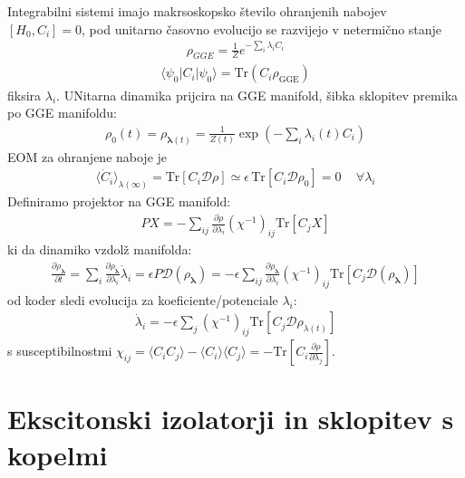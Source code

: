 \documentclass[a4paper,10pt]{article}
\begin{document}
Integrabilni sistemi imajo makrsoskopsko število ohranjenih nabojev $[H_0, C_i]=0$, pod unitarno časovno evolucijo se razvijejo v netermično stanje
\begin{align}
  \rho_{GGE} = \frac{1}{Z} e^{-\sum_{i} \lambda_{i} C_{i}}
\end{align}
\begin{align}
  \langle \psi_0 \vert{} C_i \vert{} \psi_0 \rangle = \text{Tr}(C_i \rho_{\text{GGE}})
\end{align}
fiksira $\lambda_i$. UNitarna dinamika prijcira na GGE manifold, šibka sklopitev premika po GGE manifoldu: 
\begin{align}
  \rho_0(t) = \rho_{\boldsymbol{\lambda}(t)} = \frac{1}{Z(t)} \exp\left( -\sum_i \lambda_i(t) C_i \right)
\end{align} 
EOM za ohranjene naboje je  
\begin{align}
  \langle \dot{C}_{i} \rangle_{\lambda(\infty)} = \text{Tr}[C_{i} \mathcal{D}\rho] \simeq \epsilon \, \text{Tr}[C_{i} \mathcal{D} \rho_{0}] = 0\,\quad \forall \lambda_i 
\end{align} 
Definiramo projektor na GGE manifold:
\begin{align}
  P X = -\sum_{ij} \frac{\partial \rho}{\partial \lambda_{i}} (\chi^{-1})_{ij} \text{Tr}[C_{j} X]
\end{align}   
ki da dinamiko vzdolž manifolda: 
\begin{align}
  \frac{\partial \rho_{\boldsymbol{\lambda}}}{\partial t} = \sum_i \frac{\partial \rho_{\boldsymbol{\lambda}}}{\partial \lambda_i} \dot{\lambda}_i = \epsilon P \mathcal{D}(\rho_{\boldsymbol{\lambda}}) = -\epsilon \sum_{ij} \frac{\partial \rho_{\boldsymbol{\lambda}}}{\partial \lambda_i} (\chi^{-1})_{ij} \text{Tr}\left[ C_j \mathcal{D}(\rho_{\boldsymbol{\lambda}}) \right]
\end{align}
od koder sledi evolucija za koeficiente/potenciale $\lambda_i$:
\begin{align}
  \dot{\lambda}_{i} = -\epsilon \sum_{j} (\chi^{-1})_{ij} \text{Tr}[C_{j} \mathcal{D} \rho_{\lambda(t)}]
\end{align}
s susceptibilnostmi
$\chi_{ij} = \langle C_{i} C_{j} \rangle - \langle C_{i} \rangle \langle C_{j} \rangle = -\text{Tr}\left[ C_{i} \frac{\partial \rho}{\partial \lambda_{j}} \right]$. 
\section{Ekscitonski izolatorji in sklopitev s kopelmi}
\end{document}

